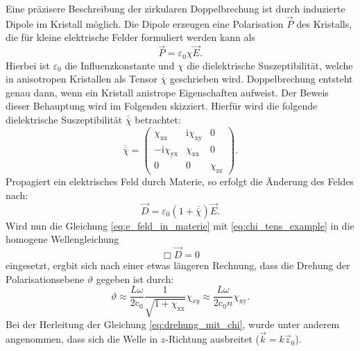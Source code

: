 Eine präzisere Beschreibung der zirkularen Doppelbrechung ist durch induzierte
Dipole im Kristall möglich.
Die Dipole erzeugen eine Polarisation $\vec{P}$ des Kristalls,
die für kleine elektrische Felder formuliert werden kann als
\begin{equation*}
\vec{P}=\varepsilon_0\chi\vec{E}.
\end{equation*}
Hierbei ist $\varepsilon_0$ die Influenzkonstante und $\chi$ die
dielektrische Suszeptibilität, welche in anisotropen Kristallen als
Tensor $\overline{\overline{\chi}}$ geschrieben wird.
Doppelbrechung entsteht genau dann, wenn ein Kristall anistrope Eigenschaften aufweist.
Der Beweis dieser Behauptung wird im Folgenden skizziert.
Hierfür wird die folgende dielektrische Suszeptibilität
 $\overline{\overline{\chi}}$ betrachtet:
\begin{equation}
  \label{eq:chi_tens_example}
  \overline{\overline{\chi}}=\begin{pmatrix} \chi_\text{xx} & \text{i}\chi_\text{xy} & 0 \\ -\text{i}\chi_\text{yx} & \chi_\text{xx} & 0 \\ 0 & 0 & \chi_\text{zz} \end{pmatrix}.
\end{equation}
Propagiert ein elektrisches Feld durch Materie, so erfolgt die Änderung des Feldes nach:
\begin{equation}
  \label{eq:e_feld_in_materie}
  \vec{D}=\varepsilon_0\left(1+\overline{\overline{\chi}}\right)\vec{E}.
\end{equation}
Wird nun die Gleichung \eqref{eq:e_feld_in_materie} mit \eqref{eq:chi_tens_example}
in die homogene Wellengleichung
\begin{equation*}
  \Box \vec{D} = 0
\end{equation*}
eingesetzt, ergbit sich nach einer etwas längeren Rechnung,
dass die Drehung der Polarisationsebene $\vartheta$ gegeben ist durch:
\begin{equation}
  \label{eq:drehung_mit_chi}
  \vartheta \approx \frac{L\omega}{2\text{c}_0} \frac{1}{\sqrt{1+\chi_\text{xx}}} \chi_{xy}\approx \frac{L\omega}{2\text{c}_0n} \chi_\text{xy}.
\end{equation}
Bei der Herleitung der Gleichung \eqref{eq:drehung_mit_chi}, wurde unter anderem angenommen,
dass sich die Welle in $z$-Richtung ausbreitet ($\vec{k}=k\vec{z}_0$).

